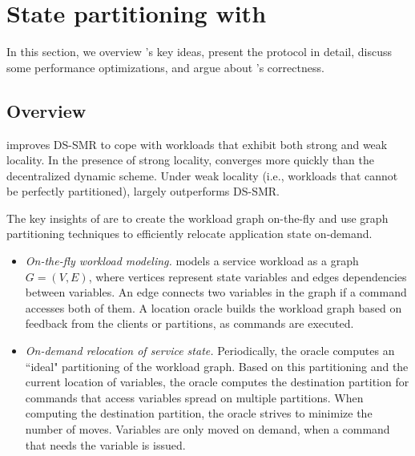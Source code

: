 \section{State partitioning with \dynastar}
\label{sec:dynastar}

In this section, we overview \dynastar's key ideas, present the protocol in detail, discuss some performance optimizations, and argue about \dynastar's correctness.

\subsection{Overview}

\dynastar improves DS-SMR to cope with workloads that exhibit both strong and weak locality.
In the presence of strong locality, \dynastar converges more quickly than the decentralized dynamic scheme.
Under weak locality (i.e., workloads that cannot be perfectly partitioned), \dynastar largely outperforms DS-SMR.

The key insights of \dynastar are to create the workload graph on-the-fly and use graph partitioning techniques to efficiently relocate application state on-demand.
\begin{itemize}
\item \emph{On-the-fly workload modeling.}
\dynastar models a service workload as a graph $G = (V, E)$, where vertices represent state variables and edges dependencies between variables.
An edge connects two variables in the graph if a command accesses both of them.
A location oracle builds the workload graph based on feedback from the clients or partitions, as commands are executed.
\item \emph{On-demand relocation of service state.}
Periodically, the oracle computes an ``ideal" partitioning of the workload graph.
Based on this partitioning and the current location of variables, the oracle computes the destination partition for commands that access variables spread on multiple partitions.
When computing the destination partition, the oracle strives to minimize the number of moves.
Variables are only moved on demand, when a command that needs the variable is issued.
\end{itemize}




